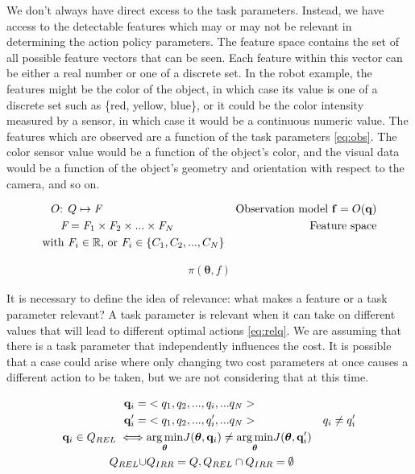 \documentclass[12pt]{article}
\newcommand{\mymath}[1]{\ensuremath{#1}\xspace}
\newcommand{\app}    {\mymath{\bm{\theta}}}
\newcommand{\taskp}  {\mymath{\mathbf{q}}}
\newcommand{\taskpv} {\mymath{q}}
\newcommand{\taskpsp}{\mymath{Q}}
\newcommand{\costf}  {\mymath{J}}
\newcommand{\feat}   {\mymath{f}}
\newcommand{\featv}  {\mymath{\mathbf{f}}}
\newcommand{\featsp} {\mymath{\emph{F}}}
\newcommand{\obsm}   {\mymath{O}}
\DeclareMathOperator*{\argmin}{arg\,min}
\newcommand{\argminvar}[1]{\ensuremath{\underset{#1}{{\argmin}}}}
\begin{document}
We don't always have direct excess to the task parameters. Instead, we have access to the detectable features which may or may not be relevant in determining the action policy parameters.  The feature space contains the set of all possible feature vectors that can be seen. Each feature within this vector can be either a real number or one of a discrete set. In the robot example, the features might be the color of the object, in which case its value is one of a discrete set such as \{red, yellow, blue\}, or it could be the color intensity measured by a sensor, in which case it would be a continuous numeric value. The features which are observed are a function of the task parameters \eqref{eq:obs}. The color sensor value would be a function of the object's color, and the visual data would be a function of the object's geometry and orientation with respect to the camera, and so on.

\begin{align}
\obsm\mbox{: } &\label{eq:obs}\taskpsp \mapsto \featsp& \mbox{Observation model~} \featv=\obsm(\taskp)\\
\featsp &= \featsp_1 \times \featsp_2 \times ... \times \featsp_N & \mbox{Feature space}\\
\mbox{with~} &\featsp_i \in \mathbb{R}\mbox{, or~} \featsp_i \in \{C_1,C_2,...,C_N\}&\notag%
\end{align}

\begin{align}
\label{eq:fgating}\pi(\app,\feat)
\end{align}

It is necessary to define the idea of relevance: what makes a feature or a task parameter relevant? A task parameter is relevant when it can take on different values that will lead to different optimal actions \eqref{eq:relq}. We are assuming that there is a task parameter that independently influences the cost. It is possible that a case could arise where only changing two cost parameters at once causes a different action to be taken, but we are not considering that at this time. 

\begin{align}
\taskp_i =& <\taskpv_1,\taskpv_2,...,\taskpv_i,...\taskpv_N> \notag & 
\\
\taskp'_i =& <\taskpv_1,\taskpv_2,...,\taskpv'_i,...\taskpv_N> \notag & \taskpv_i \neq \taskpv'_i \\
\label{eq:relq} \taskp_i \in \taskpsp_{REL} \iff&\argminvar{\app}\costf(\app,\taskp_i) \neq \argminvar{\app}\costf(\app,\taskp'_i)\\
\taskpsp_{REL} \cup & \taskpsp_{IRR} = \taskpsp,   \taskpsp_{REL} \cap \taskpsp_{IRR} = \emptyset 
\end{align}
\end{document}
